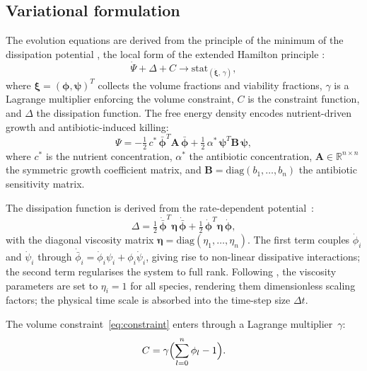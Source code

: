 \documentclass[pdflatex,sn-mathphys-ay,lineno]{sn-jnl}%
\newcommand{\bphi}{\boldsymbol{\phi}}
\newcommand{\bpsi}{\boldsymbol{\psi}}
\newcommand{\Real}{\mathbb{R}}
\begin{document}
\subsection{Variational formulation}
The evolution equations are derived from the principle of the minimum of the dissipation potential \citep{junker2014principle, hackl1997generalized}, the local form of the extended Hamilton principle \citep{JunkerBalzani2021ExtendedHamilton, JunkerBodeHackl2025Holistic}:
\begin{equation}
    \dot{\Psi} + \Delta + C \rightarrow \mathrm{stat}_{(\dot{\boldsymbol{\xi}}, \, \gamma)},
    \label{eq:variational_local}
\end{equation}
where $\boldsymbol{\xi} = (\boldsymbol{\phi}, \boldsymbol{\psi})^T$ collects the volume fractions and viability fractions, $\gamma$ is a Lagrange multiplier enforcing the volume constraint, $C$ is the constraint function, and $\Delta$ the dissipation function. The free energy density encodes nutrient-driven growth and antibiotic-induced killing:
\begin{equation}
\Psi = -\tfrac{1}{2}\,c^*\,\bar{\bphi}^T \mathbf{A}\,\bar{\bphi}
      + \tfrac{1}{2}\,\alpha^*\,\bpsi^T \mathbf{B}\,\bpsi,
\label{eq:psi}
\end{equation}
where $c^*$ is the nutrient concentration, $\alpha^*$ the antibiotic concentration, $\mathbf{A}\in\Real^{n\times n}$ the symmetric growth coefficient matrix, and $\mathbf{B}=\mathrm{diag}(b_1,\dots,b_n)$ the antibiotic sensitivity matrix.

The dissipation function is derived from the rate-dependent potential~\citep{Klempt2025ContinuumBiofilm}:
\begin{equation}
\Delta = \tfrac{1}{2}\,\dot{\bar{\bphi}}^T\boldsymbol{\eta}\,\dot{\bar{\bphi}}
          + \tfrac{1}{2}\,\dot{\bphi}^T\boldsymbol{\eta}\,\dot{\bphi},
\label{eq:dissipation}
\end{equation}
with the diagonal viscosity matrix $\boldsymbol{\eta}=\mathrm{diag}(\eta_1,\dots,\eta_n)$. The first term couples $\dot\phi_i$ and $\dot\psi_i$ through $\dot{\bar\phi}_i = \dot\phi_i\psi_i + \phi_i\dot\psi_i$, giving rise to non-linear dissipative interactions; the second term regularises the system to full rank. Following \citet{Klempt2025ContinuumBiofilm}, the viscosity parameters are set to $\eta_i=1$ for all species, rendering them dimensionless scaling factors; the physical time scale is absorbed into the time-step size $\Delta t$.

The volume constraint~\eqref{eq:constraint} enters through a Lagrange multiplier~$\gamma$:
\begin{equation}
C = \gamma\Bigl(\sum_{l=0}^{n}\phi_l - 1\Bigr).
\label{eq:cfunc}
\end{equation}
\end{document}
